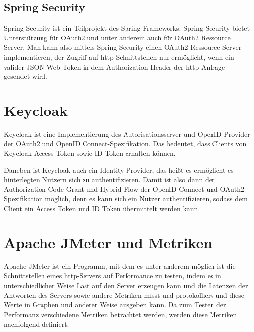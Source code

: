 \subsection{Spring Security}
Spring Security ist ein Teilprojekt des Spring-Frameworks. Spring Security bietet 
Unterstützung für OAuth2 und unter anderem auch für OAuth2 Ressource Server. 
Man kann also mittels Spring Security einen OAuth2 Ressource Server implementieren, der 
Zugriff auf http-Schnittstellen nur ermöglicht, wenn ein valider JSON Web Token in dem 
Authorization Header der http-Anfrage gesendet wird. 

\section{Keycloak}
Keycloak ist eine Implementierung des Autorisationsserver und OpenID Provider der 
OAuth2 und OpenID Connect-Spezifikation. Das bedeutet, dass Clients von Keycloak Access 
Token sowie ID Token erhalten können.\smallskip

Daneben ist Keycloak auch ein Identity Provider, das heißt es ermöglicht es hinterlegten 
Nutzern sich zu authentifizieren. Damit ist also dann der Authorization Code Grant und 
Hybrid Flow der OpenID Connect und OAuth2 Spezifikation möglich, denn es kann sich ein 
Nutzer authentifizieren, sodass dem Client ein Access Token und ID Token übermittelt 
werden kann.

\section{Apache JMeter und Metriken}
Apache JMeter ist ein Programm, mit dem es unter anderem möglich ist die Schnittstellen eines http-Servers auf 
Performance zu testen, indem es in unterschiedlicher Weise Last auf den Server erzeugen 
kann und die Latenzen der Antworten des Servers sowie andere Metriken misst und 
protokolliert und diese Werte in Graphen und anderer Weise ausgeben kann.
Da zum Testen der Performanz verschiedene Metriken betrachtet werden, werden diese 
Metriken nachfolgend definiert. 

